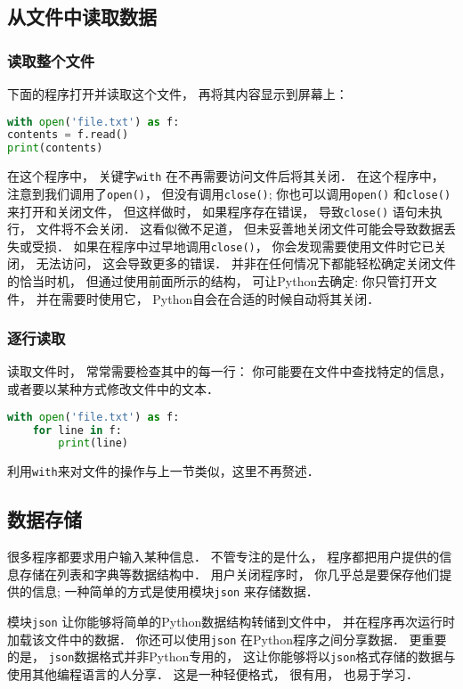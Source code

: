 \subsection{从文件中读取数据}
\subsubsection{读取整个文件}
下面的程序打开并读取这个文件， 再将其内容显示到屏幕上：
\begin{lstlisting}[language=python]
with open('file.txt') as f:
contents = f.read()
print(contents)
\end{lstlisting}
在这个程序中， 关键字\verb|with| 在不再需要访问文件后将其关闭． 在这个程序中， 注意到我们调用了\verb|open()|， 但没有调用\verb|close()|; 你也可以调用\verb|open()| 和\verb|close()| 来打开和关闭文件， 但这样做时， 如果程序存在错误， 导致\verb|close()| 语句未执行， 文件将不会关闭． 这看似微不足道， 但未妥善地关闭文件可能会导致数据丢失或受损． 如果在程序中过早地调用\verb|close()|， 你会发现需要使用文件时它已关闭， 无法访问， 这会导致更多的错误． 并非在任何情况下都能轻松确定关闭文件的恰当时机， 但通过使用前面所示的结构， 可让Python去确定: 你只管打开文件， 并在需要时使用它， Python自会在合适的时候自动将其关闭．

\subsubsection{逐行读取}
读取文件时， 常常需要检查其中的每一行： 你可能要在文件中查找特定的信息， 或者要以某种方式修改文件中的文本．
\begin{lstlisting}[language=python]
with open('file.txt') as f:
    for line in f:
        print(line)
\end{lstlisting}

利用\verb|with|来对文件的操作与上一节类似，这里不再赘述．

\subsection{数据存储}
很多程序都要求用户输入某种信息． 不管专注的是什么， 程序都把用户提供的信息存储在列表和字典等数据结构中．  用户关闭程序时， 你几乎总是要保存他们提供的信息; 一种简单的方式是使用模块\verb|json| 来存储数据．

模块\verb|json| 让你能够将简单的Python数据结构转储到文件中， 并在程序再次运行时加载该文件中的数据． 你还可以使用\verb|json| 在Python程序之间分享数据． 更重要的是， \verb|json|数据格式并非Python专用的， 这让你能够将以\verb|json|格式存储的数据与使用其他编程语言的人分享． 这是一种轻便格式， 很有用， 也易于学习．

